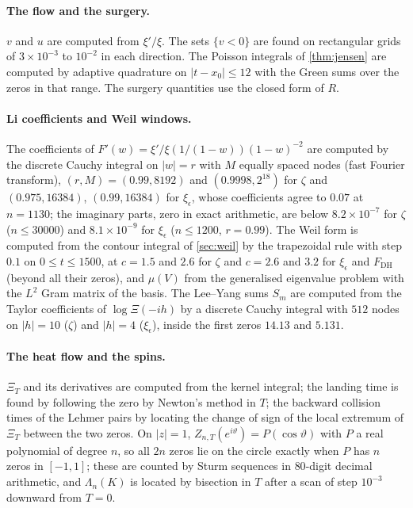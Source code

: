 \documentclass[11pt]{article}
\theoremstyle{definition}\newtheorem{definition}[theorem]{Definition}
\theoremstyle{remark}\newtheorem{remark}[theorem]{Remark}
\begin{document}
\paragraph{The flow and the surgery.} $v$ and $u$ are computed from $\xi'/\xi$. The sets $\{v<0\}$ are found on rectangular grids of $3\times10^{-3}$ to $10^{-2}$ in each direction. The Poisson integrals of \cref{thm:jensen} are computed by adaptive quadrature on $|t-x_0|\le12$ with the Green sums over the zeros in that range. The surgery quantities use the closed form of $R$.

\paragraph{Li coefficients and Weil windows.} The coefficients of $F'(w)=\xi'/\xi(1/(1-w))(1-w)^{-2}$ are computed by the discrete Cauchy integral on $|w|=r$ with $M$ equally spaced nodes (fast Fourier transform), $(r,M)=(0.99,8192)$ and $(0.9998,2^{18})$ for $\zeta$ and $(0.975,16384)$, $(0.99,16384)$ for $\xi_\epsilon$, whose coefficients agree to $0.07$ at $n=1130$; the imaginary parts, zero in exact arithmetic, are below $8.2\times10^{-7}$ for $\zeta$ ($n\le30000$) and $8.1\times10^{-9}$ for $\xi_\epsilon$ ($n\le1200$, $r=0.99$). The Weil form is computed from the contour integral of \cref{sec:weil} by the trapezoidal rule with step $0.1$ on $0\le t\le1500$, at $c=1.5$ and $2.6$ for $\zeta$ and $c=2.6$ and $3.2$ for $\xi_\epsilon$ and $F_{\mathrm{DH}}$ (beyond all their zeros), and $\mu(V)$ from the generalised eigenvalue problem with the $L^2$ Gram matrix of the basis. The Lee--Yang sums $S_m$ are computed from the Taylor coefficients of $\log\Xi(-ih)$ by a discrete Cauchy integral with $512$ nodes on $|h|=10$ ($\zeta$) and $|h|=4$ ($\xi_\epsilon$), inside the first zeros $14.13$ and $5.131$.

\paragraph{The heat flow and the spins.} $\Xi_T$ and its derivatives are computed from the kernel integral; the landing time is found by following the zero by Newton's method in $T$; the backward collision times of the Lehmer pairs by locating the change of sign of the local extremum of $\Xi_T$ between the two zeros. On $|z|=1$, $Z_{n,T}(e^{i\vartheta})=P(\cos\vartheta)$ with $P$ a real polynomial of degree $n$, so all $2n$ zeros lie on the circle exactly when $P$ has $n$ zeros in $[-1,1]$; these are counted by Sturm sequences in $80$-digit decimal arithmetic, and $\Lambda_n(K)$ is located by bisection in $T$ after a scan of step $10^{-3}$ downward from $T=0$.
\end{document}
